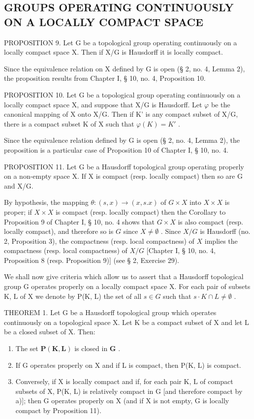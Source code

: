\subsection{GROUPS OPERATING CONTINUOUSLY ON A LOCALLY COMPACT SPACE}

PROPOSITION 9. Let G be a topological group operating continuously on a locally compact space X. Then if X/G is Hausdorff it is locally compact.

Since the equivalence relation on X defined by G is open (§ 2, no. 4, Lemma 2), the proposition results from Chapter I, § 10, no. 4, Proposition 10.

PROPOSITION 10. Let G be a topological group operating continuously on a locally compact space X, and suppose that X/G is Hausdorff. Let \(\varphi\) be the canonical mapping of X onto X/G. Then if K' is any compact subset of X/G, there is a compact subset K of X such that \(\varphi(K) = K'\) .

Since the equivalence relation defined by G is open (§ 2, no. 4, Lemma 2), the proposition is a particular case of Proposition 10 of Chapter I, § 10, no. 4.

PROPOSITION 11. Let G be a Hausdorff topological group operating properly on a non-empty space X. If X is compact (resp. locally compact) then so are G and X/G.

By hypothesis, the mapping \(\theta : (s, x) \to (x, s.x)\) of \(G \times X\) into \(X \times X\) is proper; if \(X \times X\) is compact (resp. locally compact) then the Corollary to Proposition 9 of Chapter I, § 10, no. 4 shows that \(G \times X\) is also compact (resp. locally compact), and therefore so is \(G\) since \(X \neq \emptyset\) . Since \(X/G\) is Hausdorff (no. 2, Proposition 3), the compactness (resp. local compactness) of \(X\) implies the compactness (resp. local compactness) of \(X/G\) {[}Chapter I, § 10, no. 4, Proposition 8 (resp. Proposition 9){]} (see § 2, Exercise 29).

We shall now give criteria which allow us to assert that a Hausdorff topological group G operates properly on a locally compact space X. For each pair of subsets K, L of X we denote by P(K, L) the set of all \(s \in G\) such that \(s \cdot K \cap L \neq \emptyset\) .

THEOREM 1. Let G be a Hausdorff topological group which operates continuously on a topological space X. Let K be a compact subset of X and let L be a closed subset of X. Then:

\begin{enumerate}
\def\labelenumi{\alph{enumi})}
\item
  The set \(\mathbf{P}(\mathbf{K},\mathbf{L})\) is closed in \(\mathbf{G}\) .
\item
  If G operates properly on X and if L is compact, then P(K, L) is compact.
\item
  Conversely, if X is locally compact and if, for each pair K, L of compact subsets of X, P(K, L) is relatively compact in G {[}and therefore compact by a){]}; then G operates properly on X (and if X is not empty, G is locally compact by Proposition 11).
\end{enumerate}

